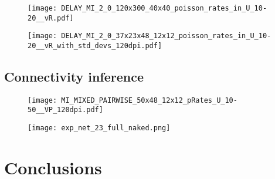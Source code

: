 \documentclass[12pt]{extarticle}
\begin{document}
\begin{figure}[H]
	\centering
	\texttt{[image: DELAY\_MI\_2\_0\_120x300\_40x40\_poisson\_rates\_in\_U\_10-20\_\_vR.pdf]}
    \caption{}
\end{figure}


\begin{figure}[H]
	\centering
	\texttt{[image: DELAY\_MI\_2\_0\_37x23x48\_12x12\_poisson\_rates\_in\_U\_10-20\_\_vR\_with\_std\_devs\_120dpi.pdf]}
    \caption{}
\end{figure}


\subsection{Connectivity inference}

\begin{figure}[H]
	\centering
	\texttt{[image: MI\_MIXED\_PAIRWISE\_50x48\_12x12\_pRates\_U\_10-50\_\_VP\_120dpi.pdf]}
    \caption{}
\end{figure}

\begin{figure}[H]
	\centering
	\texttt{[image: exp\_net\_23\_full\_naked.png]}
    \caption{}
\end{figure}


\newpage
{}
\section*{Conclusions}
\end{document}
